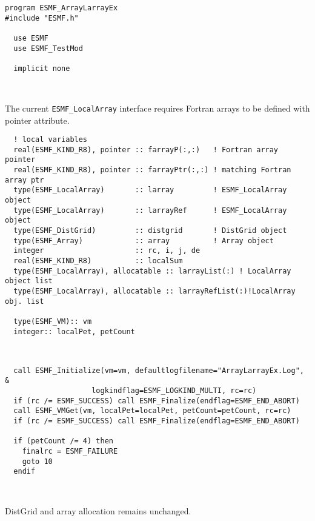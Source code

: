  \begin{verbatim}
program ESMF_ArrayLarrayEx
#include "ESMF.h"

  use ESMF
  use ESMF_TestMod
  
  implicit none
  
 
\end{verbatim}
 

   The current {\tt ESMF\_LocalArray} interface requires Fortran arrays to be 
   defined with pointer attribute. 

 \begin{verbatim}
  ! local variables
  real(ESMF_KIND_R8), pointer :: farrayP(:,:)   ! Fortran array pointer
  real(ESMF_KIND_R8), pointer :: farrayPtr(:,:) ! matching Fortran array ptr 
  type(ESMF_LocalArray)       :: larray         ! ESMF_LocalArray object
  type(ESMF_LocalArray)       :: larrayRef      ! ESMF_LocalArray object
  type(ESMF_DistGrid)         :: distgrid       ! DistGrid object
  type(ESMF_Array)            :: array          ! Array object
  integer                     :: rc, i, j, de
  real(ESMF_KIND_R8)          :: localSum
  type(ESMF_LocalArray), allocatable :: larrayList(:) ! LocalArray object list
  type(ESMF_LocalArray), allocatable :: larrayRefList(:)!LocalArray obj. list
  
  type(ESMF_VM):: vm
  integer:: localPet, petCount
  
 
\end{verbatim}
 

 \begin{verbatim}
  call ESMF_Initialize(vm=vm, defaultlogfilename="ArrayLarrayEx.Log", &
                    logkindflag=ESMF_LOGKIND_MULTI, rc=rc)
  if (rc /= ESMF_SUCCESS) call ESMF_Finalize(endflag=ESMF_END_ABORT)
  call ESMF_VMGet(vm, localPet=localPet, petCount=petCount, rc=rc)
  if (rc /= ESMF_SUCCESS) call ESMF_Finalize(endflag=ESMF_END_ABORT)
  
  if (petCount /= 4) then
    finalrc = ESMF_FAILURE
    goto 10
  endif
  
 
\end{verbatim}
 

   DistGrid and array allocation remains unchanged.
   
